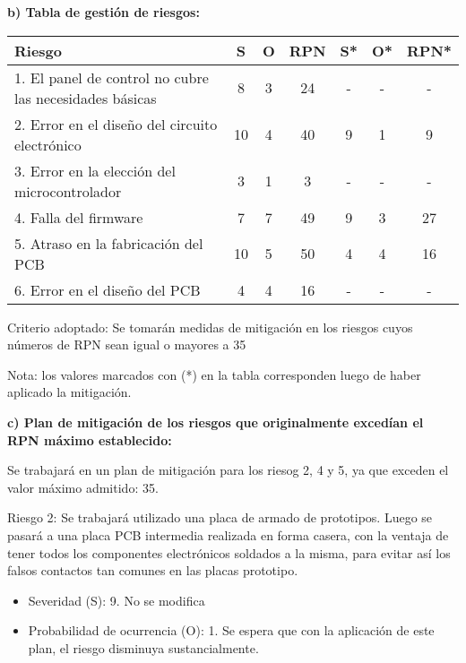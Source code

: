 \documentclass[11pt]{proyecto}
\begin{document}
\textbf{b) Tabla de gestión de riesgos:}

\begin{table}[htpb]
\centering
\begin{tabularx}{\linewidth}{@{}|X|c|c|c|c|c|c|@{}}
\hline
\rowcolor[HTML]{C0C0C0} 
Riesgo & S & O & RPN & S* & O* & RPN* \\ \hline
1. El panel de control no cubre las necesidades básicas & 8  & 3  &  \cellcolor[HTML]{7ab560}24   &   - &  -  &    -  \\ \hline
2. Error en el diseño del circuito electrónico &  10 &  4 & \cellcolor[HTML]{c94848} 40  &  9  &  1  &  \cellcolor[HTML]{7ab560}9 \\ \hline
3. Error en la elección del microcontrolador &  3 & 1  &   \cellcolor[HTML]{7ab560}3  &  -  &  -  &    -  \\ \hline
4. Falla del firmware & 7  & 7  &  \cellcolor[HTML]{c94848}49   &  9  & 3   & \cellcolor[HTML]{7ab560}27  \\ \hline
5. Atraso en la fabricación del PCB &  10 &  5 &  \cellcolor[HTML]{c94848}50   &  4  & 4   & \cellcolor[HTML]{7ab560}16  \\ \hline
6. Error en el diseño del PCB & 4  & 4  &   \cellcolor[HTML]{7ab560}16  &  -  &  - &   - \\ \hline
\end{tabularx}%
\end{table}

Criterio adoptado: 
Se tomarán medidas de mitigación en los riesgos cuyos números de RPN sean igual o mayores a 35

Nota: los valores marcados con (*) en la tabla corresponden luego de haber aplicado la mitigación.

\textbf{c) Plan de mitigación de los riesgos que originalmente excedían el RPN máximo establecido:}
 
 Se trabajará en un plan de mitigación para los riesog 2, 4 y 5, ya que exceden el valor máximo admitido: 35.
 
Riesgo 2: Se trabajará utilizado una placa de armado de prototipos. Luego se pasará a una placa PCB intermedia realizada en forma casera, con la ventaja de tener todos los componentes electrónicos soldados a la misma, para evitar así los falsos contactos tan comunes en las placas prototipo.
\begin{itemize}
\item Severidad (S): 9. No se modifica
\item Probabilidad de ocurrencia (O): 1. Se espera que con la aplicación de este plan, el riesgo disminuya sustancialmente.
\end{itemize}
\end{document}
